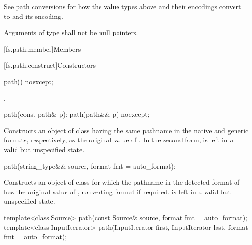 \pnum
\begin{note}
See path conversions
for how the value types above and their encodings convert to
 and its encoding.
\end{note}

\pnum
Arguments of type 
shall not be null pointers.

[fs.path.member]{Members}

[fs.path.construct]{Constructors}

%
\begin{itemdecl}
path() noexcept;
\end{itemdecl}

\begin{itemdescr}
\pnum
\ensures
{}.
\end{itemdescr}

%
\begin{itemdecl}
path(const path& p);
path(path&& p) noexcept;
\end{itemdecl}

\begin{itemdescr}
\pnum
\effects
Constructs an object of class 
having the same pathname in the native and generic formats, respectively,
as the original value of .
In the second form,  is left in a valid but unspecified state.
\end{itemdescr}

%
\begin{itemdecl}
path(string_type&& source, format fmt = auto_format);
\end{itemdecl}

\begin{itemdescr}
\pnum
\effects
Constructs an object of class 
for which the pathname in the detected-format of 
has the original value of ,
converting format if required.
 is left in a valid but unspecified state.
\end{itemdescr}

%
\begin{itemdecl}
template<class Source>
  path(const Source& source, format fmt = auto_format);
template<class InputIterator>
  path(InputIterator first, InputIterator last, format fmt = auto_format);
\end{itemdecl}

